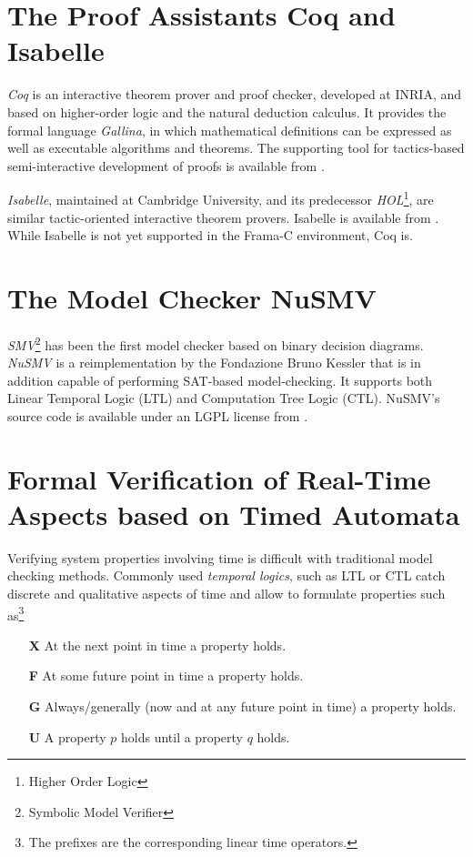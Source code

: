 \section{The Proof Assistants Coq and Isabelle}


{\em Coq} is an interactive theorem prover and proof checker,
developed at INRIA, and based on
higher-order logic and the natural deduction calculus.
%
It provides the formal language {\em Gallina}, in which
mathematical definitions can be expressed as well as
executable algorithms and theorems.
%
The supporting tool for tactics-based semi-interactive development of
proofs is available from \cite{coq}.
%

{\em Isabelle}, maintained at Cambridge University,
and its predecessor {\em HOL}\footnote{
        Higher Order Logic
},
are similar tactic-oriented interactive theorem provers.
%
Isabelle is available from \cite{isabelle}.
%
While Isabelle is not yet supported in the Frama-C environment,
Coq is.


\section{The Model Checker NuSMV}

{\em SMV}\footnote{
        Symbolic Model Verifier
}
has been the first model checker based on binary decision
diagrams.
%
{\em NuSMV} is a reimplementation by the Fondazione Bruno Kessler
that is in addition capable of
performing SAT-based model-checking.
%
It supports both
Linear Temporal Logic (LTL) and Computation Tree Logic (CTL).
%
NuSMV's source code is available under an LGPL license from
\cite{nusmv}.


\section{Formal Verification of Real-Time Aspects based on Timed Automata}
\label{sct:twt:descrTA}


Verifying system properties involving time is difficult with
traditional model checking methods. Commonly used \emph{temporal
  logics}, such as LTL or CTL catch discrete and qualitative aspects
of time and allow to formulate properties such as\footnote{The
  prefixes are the corresponding linear time operators.}
\begin{itemize}
  \item[\bf X] At the next point in time a property holds.
  \item[\bf F] At some future point in time a property holds.
  \item[\bf G] Always/generally (now and at any future point in time)
    a property holds. 
  \item[\bf U] A property $p$ holds until a property $q$ holds.
\end{itemize}

